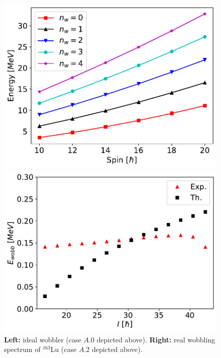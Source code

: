 \documentclass[final]{beamer}
\newlength{\colwidth}
\begin{document}
\begin{frame}[t]
\begin{columns}[t]
\begin{column}{\colwidth}
 \begin{figure}
\centering
\begin{minipage}{.5\textwidth}
  \centering
  \includegraphics[scale=1]{images/simple_wobbling_spectrum.pdf}
\end{minipage}%
\begin{minipage}{.5\textwidth}
  \centering
 \includegraphics[scale=1]{images/wobbling_energy_ThExp.pdf}
\end{minipage}
\caption{\textbf{Left:} ideal wobbler (case $A.0$ depicted above). \textbf{Right:} real wobbling spectrum of $^{163}$Lu (case $A.2$ depicted above).}
    \label{energy-function-min-point-evolution}
\end{figure}
 

\end{column}
\end{columns}
\end{frame}
\end{document}
